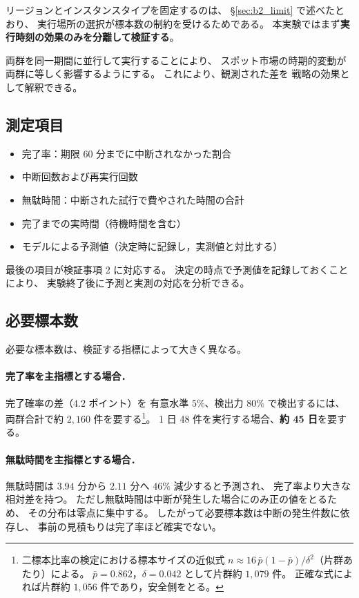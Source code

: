 \documentclass[11pt,a4paper]{ltjsreport}
\begin{document}
リージョンとインスタンスタイプを固定するのは、
\S\ref{sec:b2_limit} で述べたとおり、
実行場所の選択が標本数の制約を受けるためである。
本実験ではまず\textbf{実行時刻の効果のみを分離して検証する}。

両群を同一期間に並行して実行することにより、
スポット市場の時期的変動が
両群に等しく影響するようにする。
これにより、観測された差を
戦略の効果として解釈できる。

\subsection{測定項目}

\begin{itemize}
  \item 完了率：期限 60 分までに中断されなかった割合
  \item 中断回数および再実行回数
  \item 無駄時間：中断された試行で費やされた時間の合計
  \item 完了までの実時間（待機時間を含む）
  \item モデルによる予測値（決定時に記録し，実測値と対比する）
\end{itemize}

最後の項目が検証事項 2 に対応する。
決定の時点で予測値を記録しておくことにより、
実験終了後に予測と実測の対応を分析できる。

\subsection{必要標本数}

必要な標本数は、検証する指標によって大きく異なる。

\paragraph{完了率を主指標とする場合．}
完了確率の差（$4.2$ ポイント）を
有意水準 $5\%$、検出力 $80\%$ で検出するには、
両群合計で約 $2{,}160$ 件を要する\footnote{%
二標本比率の検定における標本サイズの近似式
$n \approx 16\,\bar p(1-\bar p)/\delta^{2}$（片群あたり）による。
$\bar p = 0.862$，$\delta = 0.042$ として片群約 $1{,}079$ 件。
正確な式によれば片群約 $1{,}056$ 件であり，安全側をとる。}。
1 日 48 件を実行する場合、\textbf{約 45 日}を要する。

\paragraph{無駄時間を主指標とする場合．}
無駄時間は $3.94$ 分から $2.11$ 分へ $46\%$ 減少すると予測され、
完了率より大きな相対差を持つ。
ただし無駄時間は中断が発生した場合にのみ正の値をとるため、
その分布は零点に集中する。
したがって必要標本数は中断の発生件数に依存し、
事前の見積もりは完了率ほど確実でない。
\end{document}
